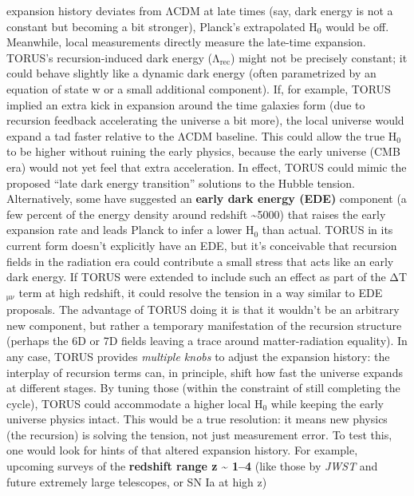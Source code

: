 \documentclass[]{article}
\newcommand{\subscript}[1]{\ensuremath{_{\mathrm{#1}}}}
\begin{document}
\begin{enumerate}
  expansion history deviates from ΛCDM at late times (say, dark energy
  is not a constant but becoming a bit stronger), Planck's extrapolated
  H\subscript{0} would be
  off. Meanwhile, local measurements directly measure the late-time
  expansion. TORUS's recursion-induced dark energy
  (Λ\subscript{rec})
  might not be precisely constant; it could behave slightly like a
  dynamic dark energy (often parametrized by an equation of state w or a
  small additional component). If, for example, TORUS implied an extra
  kick in expansion around the time galaxies form (due to recursion
  feedback accelerating the universe a bit more), the local universe
  would expand a tad faster relative to the ΛCDM baseline. This could
  allow the true
  H\subscript{0} to be
  higher without ruining the early physics, because the early universe
  (CMB era) would not yet feel that extra acceleration. In effect, TORUS
  could mimic the proposed ``late dark energy transition'' solutions to
  the Hubble tension. Alternatively, some have suggested an
  \textbf{early dark energy (EDE)} component (a few percent of the
  energy density around redshift \textasciitilde{}5000) that raises the
  early expansion rate and leads Planck to infer a lower
  H\subscript{0} than
  actual. TORUS in its current form doesn't explicitly have an EDE, but
  it's conceivable that recursion fields in the radiation era could
  contribute a small stress that acts like an early dark energy. If
  TORUS were extended to include such an effect as part of the
  ΔT\subscript{μν} term at
  high redshift, it could resolve the tension in a way similar to EDE
  proposals​. The advantage of TORUS doing it is that it wouldn't be an
  arbitrary new component, but rather a temporary manifestation of the
  recursion structure (perhaps the 6D or 7D fields leaving a trace
  around matter-radiation equality). In any case, TORUS provides
  \emph{multiple knobs} to adjust the expansion history: the interplay
  of recursion terms can, in principle, shift how fast the universe
  expands at different stages. By tuning those (within the constraint of
  still completing the cycle), TORUS could accommodate a higher local
  H\subscript{0} while
  keeping the early universe physics intact​. This would be a true
  resolution: it means new physics (the recursion) is solving the
  tension, not just measurement error. To test this, one would look for
  hints of that altered expansion history. For example, upcoming surveys
  of the \textbf{redshift range z \textasciitilde{} 1--4} (like those by
  \emph{JWST} and future extremely large telescopes, or SN Ia at high z)

\end{enumerate}
\end{document}
